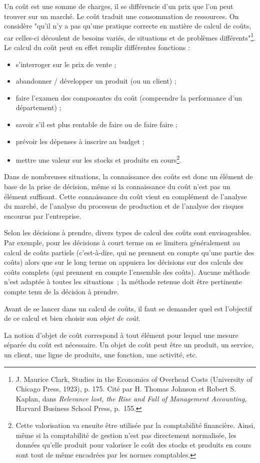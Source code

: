 \documentclass[oneside]{kaobook}
\begin{document}
Un coût est une somme de charges, il se différencie d'un prix que l'on peut trouver sur un marché. Le coût traduit une consommation de ressources. On considère "qu'il n'y a pas qu'une pratique correcte en matière de calcul de coûts, car celles-ci découlent de besoins variés, de situations et de problèmes différents"\footnote{J. Maurice Clark, Studies in the Economics of Overhead Costs (University of Chicago Press, 1923), p. 175. Cité par H. Thomas Johnson et Robert S. Kaplan, dans \emph{Relevance lost, the Rise and Fall of Management Accounting,} Harvard Business School Press, p. 155.}. Le calcul du coût peut en effet remplir différentes fonctions :
\begin{itemize}
\item s’interroger sur le prix de vente ;
\item abandonner / développer un produit (ou un client) ;
\item faire l’examen des composantes du coût (comprendre la performance d’un département) ;
\item savoir s’il est plus rentable de faire ou de faire faire ;
\item prévoir les dépenses à inscrire au budget ;
\item mettre une valeur sur les stocks et produits en cours\footnote{Cette valorisation va ensuite être utilisée par la comptabilité financière. Ainsi, même si la comptabilité de gestion n'est pas directement normalisée, les données qu'elle produit pour valoriser le coût des stocks et produits en cours sont tout de même encadrées par les normes comptables.}.
\end{itemize}

Dans de nombreuses situations, la connaissance des coûts est donc un élément de base de la prise de décision, même si la connaissance du coût n'est pas un élément suffisant. Cette connaissance du coût vient en complément de l'analyse du marché, de l'analyse du processus de production et de l'analyse des risques encourus par l'entreprise. 

Selon les décisions à prendre, divers types de calcul des coûts sont envisageables. Par exemple, pour les décisions à court terme on se limitera généralement au calcul de coûts partiels (c'est-à-dire, qui ne prennent en compte qu'une partie des coûts) alors que sur le long terme on appuiera les décisions sur des calculs des coûts complets (qui prennent en compte l'ensemble des coûts). Aucune méthode n'est adaptée à toutes les situations ; la méthode retenue doit être pertinente compte tenu de la décision à prendre. 
\begin{kaowarn}
Avant de se lancer dans un calcul de coûts, il faut se demander quel est l'objectif de ce calcul et bien choisir son \emph{objet de coût}. 
\end{kaowarn}
La notion d'objet de coût correspond à tout élément pour lequel une mesure séparée du coût est nécessaire. Un objet de coût peut être un produit, un service, un client, une ligne de produits, une fonction, une activité, etc.
\end{document}
